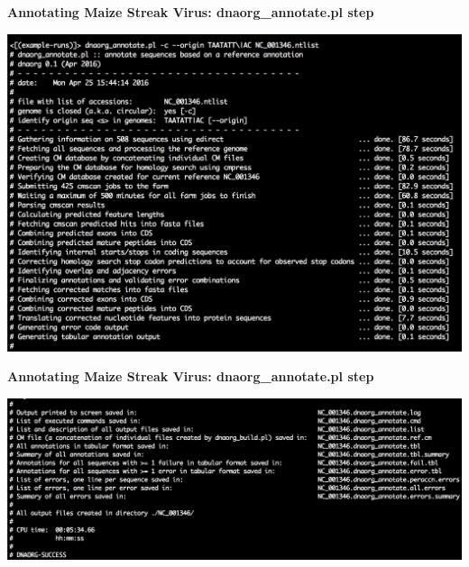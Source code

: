 \documentclass[landscape]{slides}
\begin{document}
\begin{slide}
\begin{center}
\textbf{Annotating Maize Streak Virus: dnaorg\_annotate.pl step} 

\includegraphics[width=8in]{figs/dnaorg-annotate-output1}

\end{center}
\vfill
\end{slide}
\begin{slide}
\begin{center}
\textbf{Annotating Maize Streak Virus: dnaorg\_annotate.pl step} 

\includegraphics[width=8in]{figs/dnaorg-annotate-output2}

\end{center}
\vfill
\end{slide}
\end{document}
